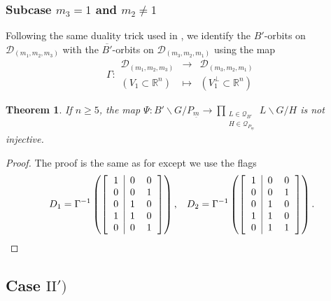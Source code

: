 \documentclass[pdftex]{sigma}
\numberwithin{equation}{section}
\newtheorem{Theorem}{Theorem}[section]
\theoremstyle{definition}
\newcommand{\R}{\mathbb{R}}
\newcommand{\D}{\mathcal{D}}
\theoremstyle{plain}
\theoremstyle{plain}
\theoremstyle{plain}
\theoremstyle{plain}
\begin{document}
\subsubsection*{Subcase $m_3 = 1$ and $m_2 \neq 1$} \label{contre exemple 2}

Following the same duality trick used in , we identify the $B'$-orbits on $\D_{(m_1,m_2,m_3)}$ with the $\overline{B'}$-orbits on $\D_{(m_3,m_2,m_1)}$ using the map 
\begin{equation*}
	\Gamma : \begin{array}{ccc}
		\D_{(m_1,m_2,m_3)} & \to & \D_{(m_3,m_2,m_1)} \\
		(V_1 \subset \R^n) & \mapsto & (V_1^\perp \subset \R^n)
	\end{array}
\end{equation*}

\begin{Theorem}
	If $n \geqslant 5$, the map $\Psi : B'\backslash G/P_{\underline m} \to \displaystyle \prod_{\substack{L \in \mathcal Q_{B'} \\ H \in \mathcal Q_{P_{\underline m}}}} L\backslash G/H$ is not injective.
\end{Theorem}
\begin{proof}
	The proof is the same as for  except we use the flags
	\begin{equation*}
		D_1 = \Gamma^{-1}\left(\left[\begin{tabular}{c|cc}
	1 & 0 & 0 \\
	0 & 0 & 1 \\
	0 & 1 & 0 \\
	1 & 1 & 0 \\
	0 & 0 & 1 
	\end{tabular}\right]\right), \hspace{3mm} D_2 = \Gamma^{-1}\left(\left[\begin{tabular}{c|cc}
		1 & 0 & 0 \\
		0 & 0 & 1 \\
		0 & 1 & 0 \\
		1 & 1 & 0 \\
		0 & 1 & 1 
	\end{tabular}\right]\right).
	\end{equation*}
\end{proof}





\subsection[Case II')]{Case $\mathrm{II}')$} \label{cas 2'}
\end{document}
